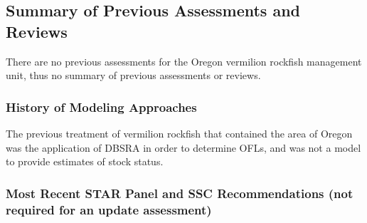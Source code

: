 \documentclass[11pt,
  english,
  a4paper,
]{article}
\begin{document}
\leavevmode\tagmcend\tagstructend\par


\hypertarget{summary-of-previous-assessments-and-reviews}{%
\subsection{Summary of Previous Assessments and Reviews}\label{summary-of-previous-assessments-and-reviews}}

\leavevmode\tagmcend\tagstructend


There are no previous assessments for the Oregon vermilion rockfish management unit, thus no summary of previous assessments or reviews.

\leavevmode\tagmcend\tagstructend\par


\hypertarget{history-of-modeling-approaches}{%
\subsubsection{History of Modeling Approaches}\label{history-of-modeling-approaches}}

\leavevmode\tagmcend\tagstructend


The previous treatment of vermilion rockfish that contained the area of Oregon was the application of DBSRA in order to determine OFLs, and was not a model to provide estimates of stock status.

\leavevmode\tagmcend\tagstructend\par


\hypertarget{most-recent-star-panel-and-ssc-recommendations-not-required-for-an-update-assessment}{%
\subsubsection{Most Recent STAR Panel and SSC Recommendations (not required for an update assessment)}\label{most-recent-star-panel-and-ssc-recommendations-not-required-for-an-update-assessment}}

\leavevmode\tagmcend\tagstructend
\end{document}
